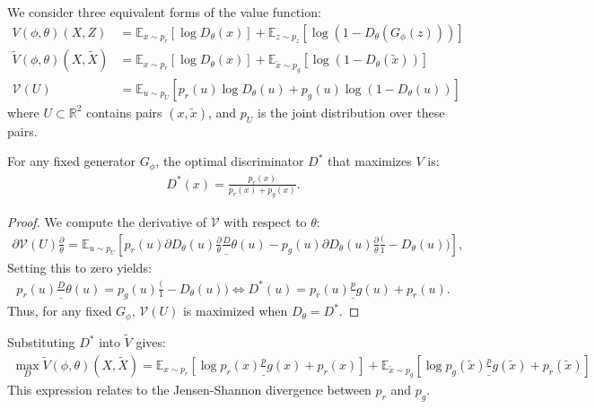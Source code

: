 We consider three equivalent forms of the value function:
\begin{align}
	V(\phi, \theta)(X, Z)                 & = \mathbb{E}_{x \sim p_r}[\log D_\theta(x)] + \mathbb{E}_{z \sim p_z}[\log(1 - D_\theta(G_\phi(z)))]         \\
	\tilde{V}(\phi, \theta)(X, \tilde{X}) & = \mathbb{E}_{x \sim p_r}[\log D_\theta(x)] + \mathbb{E}_{\tilde{x} \sim p_g}[\log(1 - D_\theta(\tilde{x}))] \\
	\mathcal{V}(U)                        & = \mathbb{E}_{u \sim p_U} [p_r(u) \log D_\theta(u) + p_g(u) \log(1 - D_\theta(u))]
\end{align}
where $U \subset \mathbb{R}^2$ contains pairs $(x, \tilde{x})$, and $p_U$ is the joint distribution over these pairs.

\begin{theorem}%
	\label{theorem:minimax}
	For any fixed generator $G_\phi$, the optimal discriminator $D^*$ that maximizes $V$ is:
	\begin{align}
		D^*(x) = \frac{p_r(x)}{p_r(x) + p_g(x)}.
	\end{align}
\end{theorem}
\begin{proof}
	We compute the derivative of $\mathcal{V}$ with respect to $\theta$:
	\begin{align}
		\label{eq:derivatives}
		{\partial \mathcal{V}(U) \frac \partial \theta} = \mathbb{E}_{u \sim p_U}\left[ p_r(u) { {\partial D_\theta(u) \frac \partial \theta} \frac D_\theta(u)} - p_g(u) {{\partial D_\theta(u) \frac \partial \theta} \frac (1 - D_\theta(u))}\right],
	\end{align}
	Setting this to zero yields:
	\begin{align}
		\label{eq:20}
		{p_r(u) \frac D_\theta(u)} = {p_g(u) \frac (1 - D_\theta(u))} \iff D^*(u) = {p_r(u) \frac p_g(u) + p_r(u)}.
	\end{align}
	Thus, for any fixed $G_\phi$, $\mathcal{V}(U)$ is maximized when $D_\theta = D^*$.
\end{proof}

Substituting $D^*$ into $\tilde{V}$ gives:
\begin{align}
	\label{eq:sum-of-two-kl-divergences}
	\max_D \tilde{V}(\phi, \theta)(X, \tilde{X}) = \mathbb{E}_{x \sim p_r}\left[\log{p_r(x) \frac p_g(x) + p_r(x)}\right] + \mathbb{E}_{\tilde{x} \sim p_g}\left[\log{p_g(\tilde{x}) \frac p_g(\tilde{x}) + p_r(\tilde{x})} \right]
\end{align}
This expression relates to the Jensen-Shannon divergence between $p_r$ and $p_g$.

